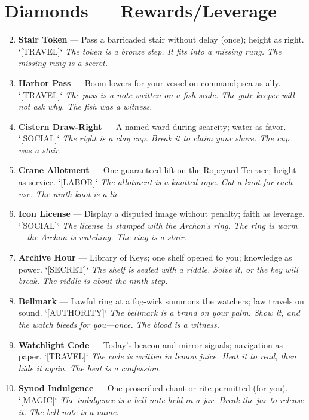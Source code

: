 \section*{Diamonds --- Rewards/Leverage}
\label{sec:thepyrgos-rewards}
\begin{enumerate}
\setcounter{enumi}{1}
\item \textbf{Stair Token} --- Pass a barricaded stair without delay (once); height as right. `[TRAVEL]`
  \hfill \textit{The token is a bronze step. It fits into a missing rung. The missing rung is a secret.}
\item \textbf{Harbor Pass} --- Boom lowers for your vessel on command; sea as ally. `[TRAVEL]`
  \hfill \textit{The pass is a note written on a fish scale. The gate-keeper will not ask why. The fish was a witness.}
\item \textbf{Cistern Draw-Right} --- A named ward during scarcity; water as favor. `[SOCIAL]`
  \hfill \textit{The right is a clay cup. Break it to claim your share. The cup was a stair.}
\item \textbf{Crane Allotment} --- One guaranteed lift on the Ropeyard Terrace; height as service. `[LABOR]`
  \hfill \textit{The allotment is a knotted rope. Cut a knot for each use. The ninth knot is a lie.}
\item \textbf{Icon License} --- Display a disputed image without penalty; faith as leverage. `[SOCIAL]`
  \hfill \textit{The license is stamped with the Archon's ring. The ring is warm---the Archon is watching. The ring is a stair.}
\item \textbf{Archive Hour} --- Library of Keys; one shelf opened to you; knowledge as power. `[SECRET]`
  \hfill \textit{The shelf is sealed with a riddle. Solve it, or the key will break. The riddle is about the ninth step.}
\item \textbf{Bellmark} --- Lawful ring at a fog-wick summons the watchers; law travels on sound. `[AUTHORITY]`
  \hfill \textit{The bellmark is a brand on your palm. Show it, and the watch bleeds for you---once. The blood is a witness.}
\item \textbf{Watchlight Code} --- Today's beacon and mirror signals; navigation as paper. `[TRAVEL]`
  \hfill \textit{The code is written in lemon juice. Heat it to read, then hide it again. The heat is a confession.}
\item \textbf{Synod Indulgence} --- One proscribed chant or rite permitted (for you). `[MAGIC]`
  \hfill \textit{The indulgence is a bell-note held in a jar. Break the jar to release it. The bell-note is a name.}

\end{enumerate}
